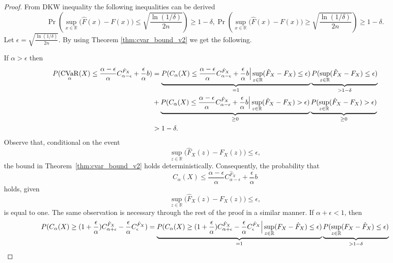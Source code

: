 \documentclass[acmlarge, manuscript, screen, review, natbib=false, oneside]{acmart}
\DeclareMathOperator{\CVaR}{CVaR}
\begin{document}
\begin{proof}
	From DKW inequality the following inequalities can be derived \cite{pmlr-v97-thomas19a}
	\begin{equation}
		\Pr \left( \sup_{x \in \mathbb{R}} \big( \hat{F}(x) - F(x) \big) 
		\leq \sqrt{\frac{\ln(1/\delta)}{2n}} \right) \geq 1 - \delta, \Pr \left( \sup_{x \in \mathbb{R}} \big( \hat{F}(x) - F(x) \big) 
		\geq \sqrt{\frac{\ln(1/\delta)}{2n}} \right) \geq 1 - \delta.
	\end{equation}
	Let $\epsilon=\sqrt{\frac{\ln(1/\delta)}{2n}}$. By using Theorem \ref{thm:cvar_bound_v2} we get the following. 
	
	If $\alpha > \epsilon$ then \begin{equation}
		\begin{aligned}
			P(\CVaR_\alpha(X) \leq \frac{\alpha-\epsilon}{\alpha}C_{\alpha-\epsilon}^{\hat{F}_X} + \frac{\epsilon}{\alpha}b) 
			&= \underbrace{P(C_\alpha(X) \leq \frac{\alpha-\epsilon}{\alpha}C_{\alpha-\epsilon}^{\hat{F}_X} + \frac{\epsilon}{\alpha}b\Bigr{|} \sup_{z\in\mathbb{R}}(\hat{F}_X-F_X)\leq \epsilon)}_{=1} 
			\underbrace{P(\sup_{z\in\mathbb{R}}(\hat{F}_X-F_X)\leq \epsilon)}_{>1-\delta} \\
			&+ \underbrace{P(C_\alpha(X) \leq \frac{\alpha-\epsilon}{\alpha}C_{\alpha-\epsilon}^{\hat{F}_X} + \frac{\epsilon}{\alpha}b\Bigr{|} \sup_{z\in\mathbb{R}}(\hat{F}_X-F_X)> \epsilon)}_{\geq 0} 
			\underbrace{P(\sup_{z\in\mathbb{R}}(\hat{F}_X-F_X)> \epsilon)}_{\geq 0} \\
			&> 1-\delta.
		\end{aligned}
	\end{equation}
	Observe that, conditional on the event 
	\[
	\sup_{z \in \mathbb{R}} \big( \hat{F}_X(z) - F_X(z) \big) \leq \epsilon,
	\]
	the bound in Theorem~\ref{thm:cvar_bound_v2} holds deterministically. Consequently, the probability that
	\[
	C_\alpha(X) \leq \frac{\alpha - \epsilon}{\alpha} C_{\alpha - \epsilon}^{\hat{F}_X} + \frac{\epsilon}{\alpha} b
	\]
	holds, given 
	\[
	\sup_{z \in \mathbb{R}} \big( \hat{F}_X(z) - F_X(z) \big) \leq \epsilon,
	\]
	is equal to one. The same observation is necessary through the rest of the proof in a similar manner.
	If $\alpha+\epsilon < 1$, then \begin{equation}
		\begin{aligned}
			P(C_\alpha(X)\geq (1+\frac{\epsilon}{\alpha})C_{\alpha+\epsilon}^{\hat{F}_X}-\frac{\epsilon}{\alpha}C_{\epsilon}^{\hat{F}_X}) 
			&= \underbrace{P(C_\alpha(X)\geq (1+\frac{\epsilon}{\alpha})C_{\alpha+\epsilon}^{\hat{F}_X}-\frac{\epsilon}{\alpha}C_{\epsilon}^{\hat{F}_X}\Bigr{|} \sup_{z\in\mathbb{R}}(F_X-\hat{F}_X)\leq \epsilon)}_{=1} \underbrace{P(\sup_{z\in\mathbb{R}}(F_X-\hat{F}_X)\leq \epsilon)}_{>1-\delta} \\

\end{aligned}
\end{equation}
\end{proof}
\end{document}
